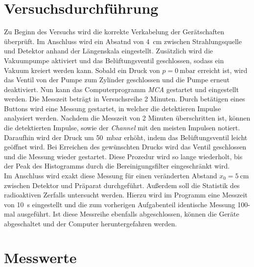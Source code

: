 \section{Versuchsdurchführung}
\label{sec:Versuchsdurchführung}

Zu Beginn des Versuchs wird die korrekte Verkabelung der Gerätschaften überprüft. Im Anschluss wird ein Absatnd von \qty{4}{\centi\meter} zwischen 
Strahlungsquelle und Detektor anhand der Längenskala eingestellt. Zusätzlich wird die Vakuumpumpe aktiviert und das Belüftungsventil geschlossen, 
sodass ein Vakuum kreiert werden kann. Sobald ein Druck von $p = \qty{0}{\milli\bar}$ erreicht ist, wird das Ventil von der Pumpe zum Zylinder 
geschlossen und die Pumpe erneut deaktiviert. Nun kann das Computerprogramm \emph{MCA} gestartet und eingestellt werden. Die Messzeit beträgt in 
Versuchsreihe 2 Minuten. Durch betätigen eines Buttons wird eine Messung gestartet, in welcher die detektieren Impulse analysiert werden. Nachdem 
die Messzeit von 2 Minuten überschritten ist, können die detektierten Impulse, sowie der \emph{Channel} mit den meisten Impulsen notiert. Daraufhin 
wird der Druck um \qty{50}{\milli\bar} erhöht, indem das Belüftungsventil leicht geöffnet wird. Bei Erreichen des gewünschten Drucks wird das Ventil
geschlossen und die Messung wieder gestartet. Diese Prozedur wird so lange wiederholt, bis der Peak des Histogramms durch die Bereinigungsfilter 
eingeschränkt wird.\\

\noindent Im Anschluss wird exakt diese Messung für einen veränderten Abstand $x_0 = \qty{5}{\centi\meter}$ zwischen Detektor und Präparat durchgeführt.
Außerdem soll die Statistik des radioaktiven Zerfalls untersucht werden. Hierzu wird im Programm eine Messzeit von \qty{10}{\second} eingestellt 
und die zum vorherigen Aufgabenteil identische Messung 100-mal ausgeführt. Ist diese Messreihe ebenfalls abgeschlossen, können die Geräte abgeschaltet
und der Computer heruntergefahren werden.   

\section{Messwerte}
\label{sec:Messwerte}





